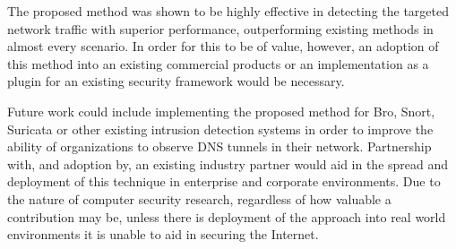 \documentclass{llncs}
\begin{document}
The proposed method was shown to be highly effective in detecting the targeted
network traffic with superior performance, outperforming existing methods in almost
every scenario. In order for this to be of value, however, an adoption of this
method into an existing commercial products or an implementation as a plugin for
an existing security framework would be necessary.

Future work could include implementing the proposed method for Bro, Snort,
Suricata or other existing intrusion detection systems in order to improve
the ability of organizations to observe DNS tunnels in their network. Partnership with, and
adoption by, an existing industry partner would aid in the spread and deployment of
this technique in enterprise and corporate environments. Due to the nature of
computer security research, regardless of how valuable a contribution may be, unless
there is deployment of the approach into real world environments it is unable
to aid in securing the Internet.



\end{document}
